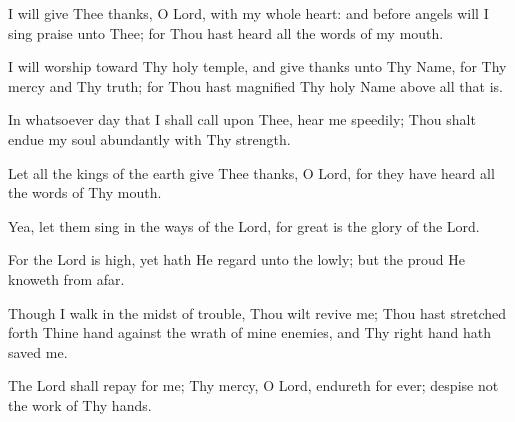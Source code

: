 I will give Thee thanks, O Lord, with my whole heart: and before angels will I sing praise unto Thee; for Thou hast heard all the words of my mouth.

I will worship toward Thy holy temple, and give thanks unto Thy Name, for Thy mercy and Thy truth; for Thou hast magnified Thy holy Name above all that is.

In whatsoever day that I shall call upon Thee, hear me speedily; Thou shalt endue my soul abundantly with Thy strength.

Let all the kings of the earth give Thee thanks, O Lord, for they have heard all the words of Thy mouth.

Yea, let them sing in the ways of the Lord, for great is the glory of the Lord.

For the Lord is high, yet hath He regard unto the lowly; but the proud He knoweth from afar.

Though I walk in the midst of trouble, Thou wilt revive me; Thou hast stretched forth Thine hand against the wrath of mine enemies, and Thy right hand hath saved me.

The Lord shall repay for me; Thy mercy, O Lord, endureth for ever; despise not the work of Thy hands.
